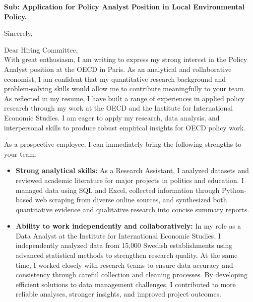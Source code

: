 \documentclass[11pt,a4paper,roman]{moderncv}
\begin{document}
\date{\today}
\opening{\textbf{Sub: Application for Policy Analyst Position in Local Environmental Policy.}}
\closing{Sincerely, \vspace{-1em}}


\makelettertitle



Dear Hiring Committee,
\\
\vspace{1em}
With great enthusiasm, I am writing to express my strong interest in the Policy Analyst position at the OECD in Paris. As an analytical and collaborative economist, I am confident that my quantitative research background and problem-solving skills would allow me to contribute meaningfully to your team.\\

\vspace{1em}
As reflected in my resume, I have built a range of experiences in applied policy research through my work at the OECD and the Institute for International Economic Studies. I am eager to apply my research, data analysis, and interpersonal skills to produce robust empirical insights for OECD policy work.\\
\vspace{1em}

As a prospective employee, I can immediately bring the following strengths to your team:
\vspace{0.5em}
\begin{itemize}
\item \textbf{Strong analytical skills:} As a Research Assistant, I analyzed datasets and reviewed academic literature for major projects in politics and education. I managed data using SQL and Excel, collected information through Python-based web scraping from diverse online sources, and synthesized both quantitative evidence and qualitative research into concise summary reports.
\item \textbf{Ability to work independently and collaboratively:} In my role as a Data Analyst at the Institute for International Economic Studies, I independently analyzed data from 15,000 Swedish establishments using advanced statistical methods to strengthen research quality. At the same time, I worked closely with research teams to ensure data accuracy and consistency through careful collection and cleaning processes. By developing efficient solutions to data management challenges, I contributed to more reliable analyses, stronger insights, and improved project outcomes.
\end{itemize}
\end{document}
